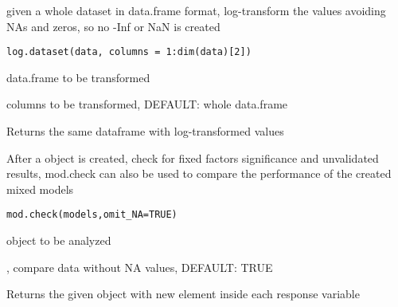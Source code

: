 \documentclass[letterpaper]{book}
\begin{document}
%
\begin{Description}\relax
given a whole dataset in data.frame format, log-transform the values avoiding NAs and zeros,
so no -Inf or NaN is created
\end{Description}
%
\begin{Usage}
\begin{verbatim}
log.dataset(data, columns = 1:dim(data)[2])
\end{verbatim}
\end{Usage}
%
\begin{Arguments}
\begin{ldescription}
\item[\code{data}] 
data.frame to be transformed

\item[\code{columns}] 
columns to be transformed, DEFAULT: whole data.frame

\end{ldescription}
\end{Arguments}
%
\begin{Value}
Returns the same dataframe with log-transformed values
\end{Value}
%
\begin{Description}\relax
After a  object is created, check for fixed factors significance and unvalidated results,
mod.check can also be used to compare the performance of the created mixed models
\end{Description}
%
\begin{Usage}
\begin{verbatim}
mod.check(models,omit_NA=TRUE)
\end{verbatim}
\end{Usage}
%
\begin{Arguments}
\begin{ldescription}
\item[\code{models}] 
 object to be analyzed

\item[\code{omit\_NA}] 
, compare data without NA values, DEFAULT: TRUE

\end{ldescription}
\end{Arguments}
%
\begin{Value}
Returns the given  object with new  element inside each response variable
\end{Value}
\end{document}
